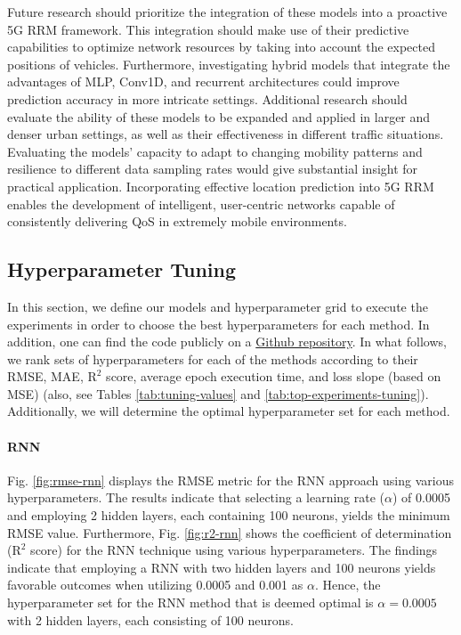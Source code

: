 \documentclass[conference]{IEEEtran}
\begin{document}
{Future research should prioritize the integration of these models into a proactive 5G RRM framework. This integration should make use of their predictive capabilities to optimize network resources by taking into account the expected positions of vehicles. Furthermore, investigating hybrid models that integrate the advantages of MLP, Conv1D, and recurrent architectures could improve prediction accuracy in more intricate settings. Additional research should evaluate the ability of these models to be expanded and applied in larger and denser urban settings, as well as their effectiveness in different traffic situations. Evaluating the models' capacity to adapt to changing mobility patterns and resilience to different data sampling rates would give substantial insight for practical application. Incorporating effective location prediction into 5G RRM enables the development of intelligent, user-centric networks capable of consistently delivering QoS in extremely mobile environments.


 
{}

\begin{appendices}
\section{Hyperparameter Tuning} \label{tuning-annex}
In this section, we define our models and hyperparameter grid to execute the experiments in order to choose the best hyperparameters for each method. In addition, one can find the code publicly on a \href{https://github.com/sinaebrahimi/Location_Prediction_-ANN-7088CEM-Project-}{Github repository}. In what follows, we rank sets of hyperparameters for each of the methods according to their RMSE, MAE, $\text{R}^2$ score, average epoch execution time, and loss slope (based on MSE) (also, see Tables \ref{tab:tuning-values} and \ref{tab:top-experiments-tuning}). Additionally, we will determine the optimal hyperparameter set for each method.

\paragraph{RNN}
Fig. \ref{fig:rmse-rnn} displays the RMSE metric for the RNN approach using various hyperparameters. The results indicate that selecting a learning rate ($\alpha$) of 0.0005 and employing 2 hidden layers, each containing 100 neurons, yields the minimum RMSE value. Furthermore, Fig. \ref{fig:r2-rnn} shows the coefficient of determination ($\text{R}^2$ score) for the RNN technique using various hyperparameters. The findings indicate that employing a RNN with two hidden layers and 100 neurons yields favorable outcomes when utilizing 0.0005 and 0.001 as $\alpha$. Hence, the hyperparameter set for the RNN method that is deemed optimal is $\alpha=0.0005$ with 2 hidden layers, each consisting of 100 neurons.


\end{appendices}}
\end{document}
